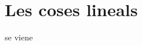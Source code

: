 \documentclass[../Apunts.tex]{subfiles}
\begin{document}
\chapter{Les coses lineals}
se viene
\end{document}
